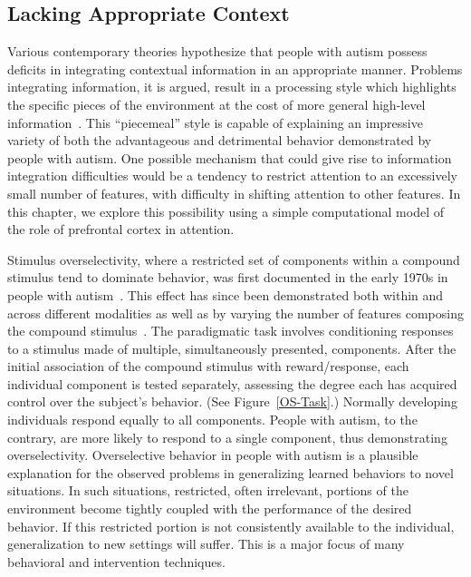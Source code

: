 %
%

\subsection{Lacking Appropriate Context}
Various contemporary theories hypothesize that people with autism possess deficits in integrating contextual information in an appropriate manner.  Problems integrating information, it is argued, result in a processing style which highlights the specific pieces of the environment at the cost of more general high-level information~\cite{HappeF:1999:WCC}. This ``piecemeal'' style is capable of explaining an impressive variety of both the advantageous and detrimental behavior demonstrated by people with autism.  One possible mechanism that could give rise to information integration difficulties would be a tendency to restrict attention to an excessively small number of features, with difficulty in shifting attention to other features.  In this chapter, we explore this possibility using a simple computational model of the role of prefrontal cortex in attention.

Stimulus overselectivity, where a restricted set of components within a compound stimulus tend to dominate behavior, was first documented in the early 1970s in people with autism~\cite{RefWorks:110}.  This effect has since been demonstrated both within and across different modalities as well as by varying the number of features composing the compound stimulus~\cite{RefWorks:112}.  The paradigmatic task involves conditioning responses to a stimulus made of multiple, simultaneously presented, components.  After the initial association of the compound stimulus with reward/response, each individual component is tested separately, assessing the degree each has acquired control over the subject's behavior. (See Figure~\ref{OS-Task}.)  Normally developing individuals respond equally to all components.  People with autism, to the contrary, are more likely to respond to a single component, thus demonstrating overselectivity.  Overselective behavior in people with autism is a plausible explanation for the observed problems in generalizing learned behaviors to novel situations.  In such situations, restricted, often irrelevant, portions of the environment become tightly coupled with the performance of the desired behavior.  If this restricted portion is not consistently available to the individual, generalization to new settings will suffer.  This is a major focus of many behavioral and intervention techniques. 

